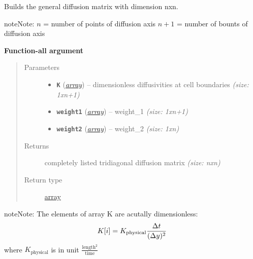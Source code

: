\documentclass[a4paper,10pt,english]{sphinxmanual}
\begin{document}
\begin{fulllineitems}
\label{api/climlab.dynamics:climlab.dynamics.diffusion._make_diffusion_matrix}
Builds the general diffusion matrix with dimension nxn.

\begin{notice}{note}{Note:}
\(n\)   = number of points of diffusion axis
\(n+1\) = number of bounts of diffusion axis
\end{notice}

\textbf{Function-all argument}
\begin{quote}\begin{description}
\item[{Parameters}] \leavevmode\begin{itemize}
\item {} 
\textbf{\texttt{K}} (\href{http://docs.python.org/2.7/library/array.html\#module-array}{\emph{array}}) -- dimensionless diffusivities at cell boundaries
\emph{(size: 1xn+1)}

\item {} 
\textbf{\texttt{weight1}} (\href{http://docs.python.org/2.7/library/array.html\#module-array}{\emph{array}}) -- weight\_1 \emph{(size: 1xn+1)}

\item {} 
\textbf{\texttt{weight2}} (\href{http://docs.python.org/2.7/library/array.html\#module-array}{\emph{array}}) -- weight\_2 \emph{(size: 1xn)}

\end{itemize}

\item[{Returns}] \leavevmode
completely listed tridiagonal diffusion matrix \emph{(size: nxn)}

\item[{Return type}] \leavevmode
\href{http://docs.python.org/2.7/library/array.html\#module-array}{array}

\end{description}\end{quote}

\begin{notice}{note}{Note:}
The elements of array K are acutally dimensionless:
\begin{gather}
\begin{split}K[i] = K_{\textrm{physical}}  \frac{\Delta t}{(\Delta y)^2}\end{split}\notag
\end{gather}
where \(K_{\textrm{physical}}\) is in unit \(\frac{\textrm{length}^2}{\textrm{time}}\)
\end{notice}


\end{fulllineitems}
\end{document}
